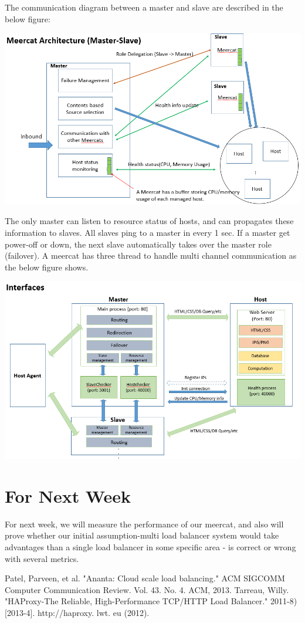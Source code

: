 \documentclass[11pt,letter]{article}
\begin{document}
The communication diagram between a master and slave are described in the below figure:
\begin{center}
	\includegraphics[scale=0.5]{./comm.png}
\end{center}

The only master can listen to resource status of hosts, and can propagates these information to slaves. All slaves ping to a master in every 1 sec. If a master get power-off or down, the next slave automatically takes over the master role (failover). A meercat has three thread to handle multi channel communication as the below figure shows.
\begin{center}
	\includegraphics[scale=0.5]{./interface.png}
\end{center}
 
\section{For Next Week}
For next week, we will measure the performance of our meercat, and also will prove whether our initial assumption-multi load balancer system would take advantages than a single load balancer in some specific area - is correct or wrong with several metrics.

\begin{thebibliography}{9}
  Patel, Parveen, et al. "Ananta: Cloud scale load balancing." ACM SIGCOMM Computer Communication Review. Vol. 43. No. 4. ACM, 2013.
  Tarreau, Willy. "HAProxy-The Reliable, High-Performance TCP/HTTP Load Balancer." 2011-8)[2013-4]. http://haproxy. lwt. eu (2012).
\end{thebibliography}
\end{document}
